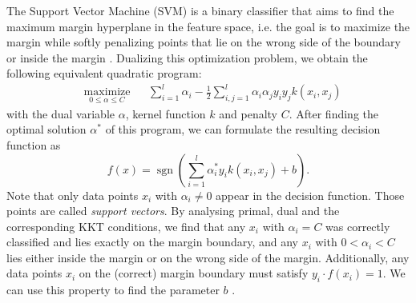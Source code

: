 

The Support Vector Machine (SVM) is a binary classifier that aims to find the maximum margin hyperplane in the feature space, i.e. the goal is to maximize the margin while softly penalizing points that lie on the wrong side of the boundary or inside the margin \cite{Bishop2006}. Dualizing this optimization problem, we obtain the following equivalent quadratic program:
\begin{equation*}
\begin{aligned}
& \underset{0 \leq \alpha \leq C}{\text{maximize}}
& & \sum_{i = 1}^{l}\alpha_i - \frac{1}{2} \sum_{i, j = 1}^{l}\alpha_i  \alpha_j y_i y_j k(x_i, x_j)
\end{aligned}
\end{equation*}
with the dual variable $\alpha$, kernel function $k$ and penalty $C$.
After finding the optimal solution $\alpha^*$ of this program, we can formulate the resulting decision function as
\begin{equation*}
f(x) = \operatorname{sgn}\left(\sum_{i=1}^{l}\alpha^*_i y_i k(x_i,x_j)+b\right).
\end{equation*}
Note that only data points $x_i$ with $\alpha_i \neq 0$ appear in the decision function. Those points are called \textit{support vectors}. By analysing primal, dual and the corresponding KKT conditions, we find that any $x_i$ with $\alpha_i = C$ was correctly classified and lies exactly on the margin boundary, and any $x_i$ with $0<\alpha_i < C$ lies either inside the margin or on the wrong side of the margin. Additionally, any data points $x_i$ on the (correct) margin boundary must satisfy $y_i\cdot f(x_i) = 1$. We can use this property to find the parameter $b$ \cite{Bishop2006}.